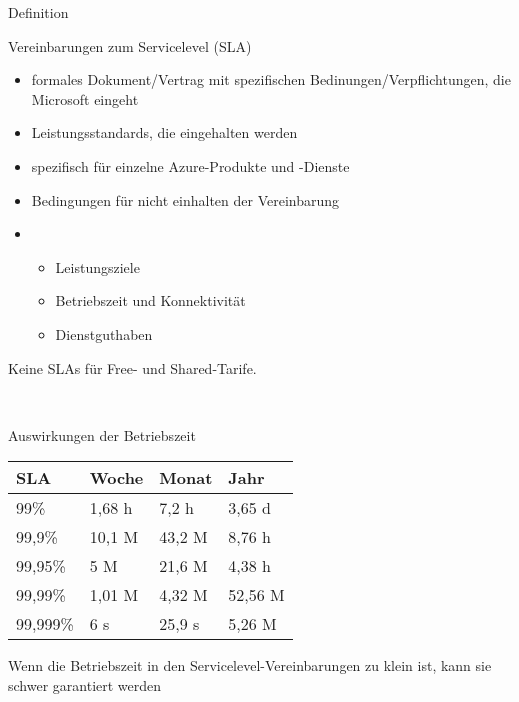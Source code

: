 \documentclass{scrartcl}
\newenvironment{flashcard}[2][]{%
    #1
    \vfill
    \centerline{\Large{#2}}
    \vfill
\newpage
}
{\newpage}
\begin{document}
    \begin{flashcard}[Definition]{Vereinbarungen zum Servicelevel (SLA)}
        \begin{itemize}
            \item formales Dokument/Vertrag mit spezifischen Bedinungen/Verpflichtungen, die Microsoft eingeht
            \item Leistungsstandards, die eingehalten werden
            \item spezifisch für einzelne Azure-Produkte und -Dienste
            \item Bedingungen für nicht einhalten der Vereinbarung
            \item
                \begin{itemize}
                    \item Leistungsziele
                    \item Betriebszeit und Konnektivität
                    \item Dienstguthaben
                \end{itemize}

        \end{itemize}
        Keine SLAs für Free- und Shared-Tarife.
    \end{flashcard}

    \begin{flashcard}[\ ]{Auswirkungen der Betriebszeit}
        \begin{tabular}{l|lll}
            SLA      &  Woche  & Monat  & Jahr    \\
            \hline
            99\%     &  1,68 h & 7,2 h  & 3,65 d  \\
            99,9\%   &  10,1 M & 43,2 M & 8,76 h  \\
            99,95\%  &  5 M    & 21,6 M & 4,38 h  \\
            99,99\%  &  1,01 M & 4,32 M & 52,56 M \\
            99,999\% &  6 s    & 25,9 s & 5,26 M  \\
        \end{tabular}

        \vspace{5mm}
        Wenn die Betriebszeit in den Servicelevel-Vereinbarungen zu klein ist, kann sie schwer garantiert werden
    \end{flashcard}
\end{document}
